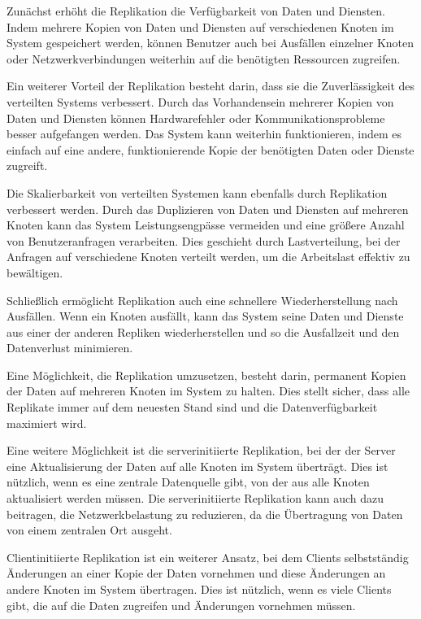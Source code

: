 Zunächst erhöht die Replikation die Verfügbarkeit von Daten und Diensten. Indem mehrere Kopien von Daten und Diensten auf verschiedenen Knoten im System gespeichert werden, können Benutzer auch bei Ausfällen einzelner Knoten oder Netzwerkverbindungen weiterhin auf die benötigten Ressourcen zugreifen.

Ein weiterer Vorteil der Replikation besteht darin, dass sie die Zuverlässigkeit des verteilten Systems verbessert. Durch das Vorhandensein mehrerer Kopien von Daten und Diensten können Hardwarefehler oder Kommunikationsprobleme besser aufgefangen werden. Das System kann weiterhin funktionieren, indem es einfach auf eine andere, funktionierende Kopie der benötigten Daten oder Dienste zugreift.

Die Skalierbarkeit von verteilten Systemen kann ebenfalls durch Replikation verbessert werden. Durch das Duplizieren von Daten und Diensten auf mehreren Knoten kann das System Leistungsengpässe vermeiden und eine größere Anzahl von Benutzeranfragen verarbeiten. Dies geschieht durch Lastverteilung, bei der Anfragen auf verschiedene Knoten verteilt werden, um die Arbeitslast effektiv zu bewältigen.

Schließlich ermöglicht Replikation auch eine schnellere Wiederherstellung nach Ausfällen. Wenn ein Knoten ausfällt, kann das System seine Daten und Dienste aus einer der anderen Repliken wiederherstellen und so die Ausfallzeit und den Datenverlust minimieren.

Eine Möglichkeit, die Replikation umzusetzen, besteht darin, permanent Kopien der Daten auf mehreren Knoten im System zu halten. Dies stellt sicher, dass alle Replikate immer auf dem neuesten Stand sind und die Datenverfügbarkeit maximiert wird.

Eine weitere Möglichkeit ist die serverinitiierte Replikation, bei der der Server eine Aktualisierung der Daten auf alle Knoten im System überträgt. Dies ist nützlich, wenn es eine zentrale Datenquelle gibt, von der aus alle Knoten aktualisiert werden müssen. Die serverinitiierte Replikation kann auch dazu beitragen, die Netzwerkbelastung zu reduzieren, da die Übertragung von Daten von einem zentralen Ort ausgeht.

Clientinitiierte Replikation ist ein weiterer Ansatz, bei dem Clients selbstständig Änderungen an einer Kopie der Daten vornehmen und diese Änderungen an andere Knoten im System übertragen. Dies ist nützlich, wenn es viele Clients gibt, die auf die Daten zugreifen und Änderungen vornehmen müssen.


